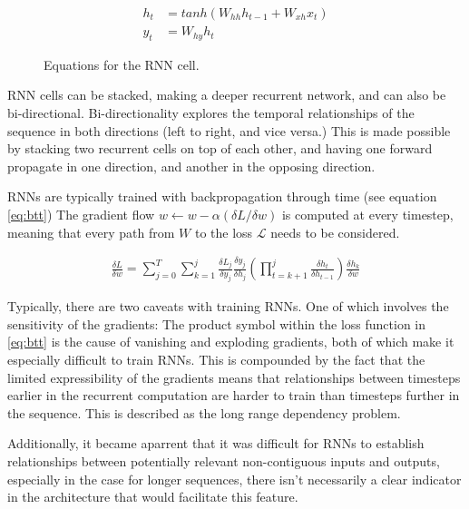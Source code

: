 \documentclass[12pt,twoside]{report}
\begin{document}
\begin{figure}[!ht]
\begin{equation}
\label{eq:rnn}
\begin{aligned}
	h_t &= tanh(W_{hh}h_{t-1}+W_{xh}x_t)
\\
y_t &= W_{hy}h_t
\end{aligned}
\end{equation}
\captionsetup{labelformat=empty}
\caption{Equations for the RNN cell.}
\end{figure}

RNN cells can be stacked, making a deeper recurrent network, and can also be bi-directional. Bi-directionality explores the temporal relationships of the sequence in both directions (left to right, and vice versa.) This is made possible by stacking two recurrent cells on top of each other, and having one forward propagate in one direction, and another in the opposing direction.

RNNs are typically trained with backpropagation through time (see equation \ref{eq:btt}) The gradient flow $w \leftarrow w - \alpha ({\delta L}/{\delta w})$ is computed at every timestep, meaning that every path from $W$ to the loss $\mathcal{L}$ needs to be considered.

\begin{equation}
\label{eq:btt}
\begin{aligned}
	\frac{\delta L}{\delta w} = \sum^T_{j=0}\sum^j_{k=1}\frac{\delta L_j}{\delta y_j}\frac{\delta y_j}{\delta h_j}(\prod^j_{t=k+1}\frac{\delta h_t}{\delta h_{t-1}})\frac{\delta h_k}{\delta w}
\end{aligned}
\end{equation}

Typically, there are two caveats with training RNNs. One of which involves the sensitivity of the gradients: The product symbol within the loss function in \ref{eq:btt} is the cause of vanishing and exploding gradients, both of which make it especially difficult to train RNNs. This is compounded by the fact that the limited expressibility of the gradients means that relationships between timesteps earlier in the recurrent computation are harder to train than timesteps further in the sequence. This is described as the long range dependency problem.

Additionally, it became aparrent that it was difficult for RNNs to establish relationships between potentially relevant non-contiguous inputs and outputs, especially in the case for longer sequences, there isn't necessarily a clear indicator in the architecture that would facilitate this feature. 
\end{document}
